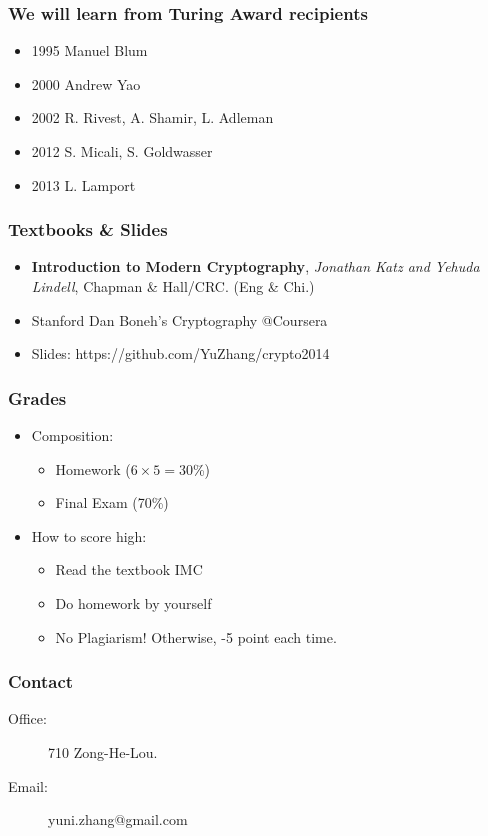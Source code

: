 \begin{frame}\frametitle{We will learn from Turing Award recipients}
\begin{itemize}
\item{1995} Manuel Blum
\item{2000} Andrew Yao
\item{2002} R. Rivest, A. Shamir, L. Adleman
\item{2012} S. Micali, S. Goldwasser
\item{2013} L. Lamport
\end{itemize}	
\end{frame}
\begin{frame}\frametitle{Textbooks \& Slides}
\begin{itemize}
\item \textbf{Introduction to Modern Cryptography}, \emph{Jonathan Katz and Yehuda Lindell}, Chapman \& Hall/CRC. (Eng \& Chi.)
\item Stanford Dan Boneh's Cryptography @Coursera
\item Slides: https://github.com/YuZhang/crypto2014
\end{itemize}
\end{frame}
\begin{frame}\frametitle{Grades}
\begin{itemize}
\item Composition:
\begin{itemize}
\item Homework ($6 \times 5 = 30$\%)
\item Final Exam (70\%)
\end{itemize}
\item How to score high:
\begin{itemize}
\item Read the textbook IMC
\item Do homework by yourself
\item \alert{No Plagiarism!} Otherwise, -5 point each time. 
\end{itemize}
\end{itemize}
\end{frame}
\begin{frame}\frametitle{Contact}
\begin{description} 
\item[Office:] 710 Zong-He-Lou.
\item[Email:] yuni.zhang@gmail.com 
\end{description}
\end{frame}

